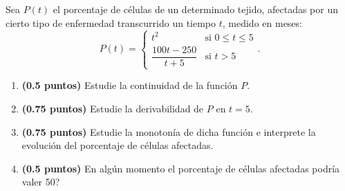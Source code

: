 
Sea $P(t)$ el porcentaje de células de un determinado tejido, afectadas por un cierto tipo de enfermedad transcurrido un tiempo $t$, medido en meses:
\[
P(t)=\begin{cases}
t^2&\text{si }0\leq t\leq5\\[0.5em]
\dfrac{100t-250}{t+5}&\text{si }t>5
\end{cases}.
\]
\begin{enumerate}[label=\alph*)]
\item \textbf{(0.5 puntos)} Estudie la continuidad de la función $P$.
\item \textbf{(0.75 puntos)} Estudie la derivabilidad de $P$ en $t=5$.
\item \textbf{(0.75 puntos)} Estudie la monotonía de dicha función e interprete la evolución del porcentaje de células afectadas.
\item \textbf{(0.5 puntos)} \textquestiondown{}En algún momento el porcentaje de células afectadas podría valer 50?
\end{enumerate}
